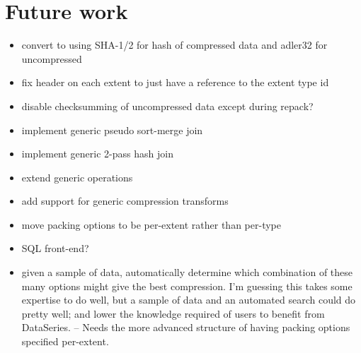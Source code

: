 \section{Future work}\label{sec:future-work}

\begin{itemize}
\item convert to using SHA-1/2 for hash of compressed data and adler32 for uncompressed
\item fix header on each extent to just have a reference to the extent type id
\item disable checksumming of uncompressed data except during repack?
\item implement generic pseudo sort-merge join
\item implement generic 2-pass hash join
\item extend generic operations
\item add support for generic compression transforms
\item move packing options to be per-extent rather than per-type
\item SQL front-end?
\item given a sample of data, automatically determine
 which combination of these many options might give the best compression.
 I'm guessing this takes some expertise to do well, but a sample of data
 and an automated search could do pretty well; and lower the knowledge
 required of users to benefit from DataSeries. -- Needs the more advanced 
 structure of having packing options specified per-extent.
\end{itemize}
